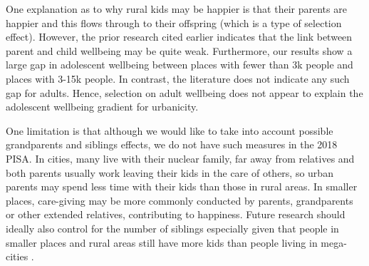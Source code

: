 \documentclass[10pt, letterpaper]{article}
\begin{document}
\begin{spacing}{1.4}

One explanation as to why rural kids may be happier is that their parents are
happier and this flows through to their offspring (which is a type of  selection
effect). However, the prior research cited earlier indicates that the link between parent and child wellbeing may
be quite weak. Furthermore, our results show a large gap in adolescent wellbeing between places with fewer than 3k
people and places with 3-15k people.
 In contrast, the literature does not indicate any such gap for adults. Hence,
selection on adult wellbeing does not appear to explain the adolescent wellbeing gradient for
urbanicity.

One limitation is that although we would like to take into account possible grandparents and siblings effects, we do not have such measures in the 2018 PISA. %
In cities, many live with their nuclear family, far away from relatives and both
parents usually work leaving their kids in the  care of others, so urban parents
may spend less time with their kids than those in rural areas. In smaller
places, care-giving may be
more commonly conducted by parents, grandparents or other extended relatives, contributing to happiness. 
Future research should ideally also  control for the number of siblings
especially given that people in smaller places and rural areas still have more kids than people living in mega-cities \citep{lerch2019regional}. %

\end{spacing}
\end{document}

